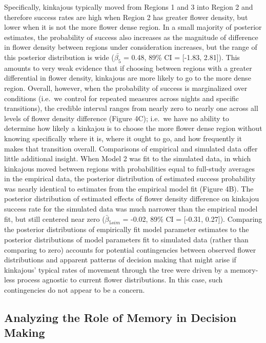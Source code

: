 \documentclass[twoside,12pt,final]{ucthesis-CA2012}
\begin{document}
\begin{ucmainmatter}
Specifically, kinkajous typically moved from Regions 1 and 3 into Region 2 and therefore success rates are high when Region 2 has greater flower density, but lower when it is not the more flower dense region. In a small majority of posterior estimates, the probability of success also increases as the magnitude of difference in flower density between regions under consideration increases, but the range of this posterior distribution is wide (\(\bar{\beta_5}\) = 0.48, 89\% CI = {[}-1.83, 2.81{]}). This amounts to very weak evidence that if choosing between regions with a greater differential in flower density, kinkajous are more likely to go to the more dense region. Overall, however, when the probability of success is marginalized over conditions (i.e.~we control for repeated measures across nights and specific transitions), the credible interval ranges from nearly zero to nearly one across all levels of flower density difference (Figure 4C); i.e.~we have no ability to determine how likely a kinkajou is to choose the more flower dense region without knowing specifically where it is, where it ought to go, and how frequently it makes that transition overall.
Comparisons of empirical and simulated data offer little additional insight. When Model 2 was fit to the simulated data, in which kinkajous moved between regions with probabilities equal to full-study averages in the empirical data, the posterior distribution of estimated success probability was nearly identical to estimates from the empirical model fit (Figure 4B). The posterior distribution of estimated effects of flower density difference on kinkajou success rate for the simulated data was much narrower than the empirical model fit, but still centered near zero (\(\bar{\beta}_{5sim}\) = -0.02, 89\% CI = {[}-0.31, 0.27{]}). Comparing the posterior distributions of empirically fit model parameter estimates to the posterior distributions of model parameters fit to simulated data (rather than comparing to zero) accounts for potential contingencies between observed flower distributions and apparent patterns of decision making that might arise if kinkajous' typical rates of movement through the tree were driven by a memory-less process agnostic to current flower distributions. In this case, such contingencies do not appear to be a concern.

\hypertarget{analyzing-the-role-of-memory-in-decision-making}{%
\subsection{Analyzing the Role of Memory in Decision Making}\label{analyzing-the-role-of-memory-in-decision-making}}


\end{ucmainmatter}
\end{document}
